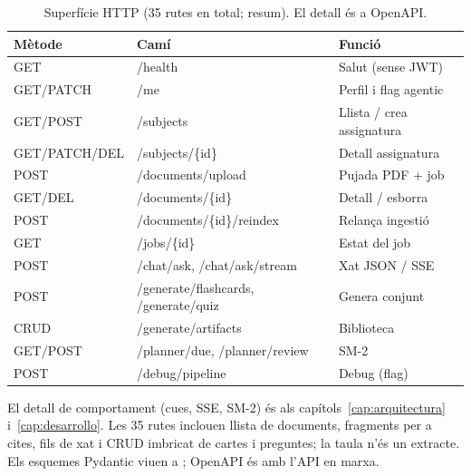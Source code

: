 \begin{table}[htbp]
\centering
\caption{Superfície HTTP (35 rutes en total; resum). El detall és a OpenAPI.}
\label{tab:api}
\small
\begin{tabularx}{\textwidth}{l>{\raggedright\arraybackslash\ttfamily}p{5.2cm}X}
\toprule
Mètode & Camí & Funció \\
\midrule
GET & /health & Salut (sense JWT) \\
GET/PATCH & /me & Perfil i flag agentic \\
GET/POST & /subjects & Llista / crea assignatura \\
GET/PATCH/DEL & /subjects/\{id\} & Detall assignatura \\
POST & /documents/upload & Pujada PDF + job \\
GET/DEL & /documents/\{id\} & Detall / esborra \\
POST & /documents/\{id\}/reindex & Relança ingestió \\
GET & /jobs/\{id\} & Estat del job \\
POST & /chat/ask, /chat/ask/stream & Xat JSON / SSE \\
POST & /generate/flashcards, /generate/quiz & Genera conjunt \\
CRUD & /generate/artifacts & Biblioteca \\
GET/POST & /planner/due, /planner/review & SM-2 \\
POST & /debug/pipeline & Debug (flag) \\
\bottomrule
\end{tabularx}
\end{table}

El detall de comportament (cues, SSE, SM-2) és als capítols~\ref{cap:arquitectura} i~\ref{cap:desarrollo}.
Les 35 rutes inclouen llista de documents, fragments per a cites, fils de xat i CRUD imbricat de cartes i preguntes; la taula n'és un extracte.
Els esquemes Pydantic viuen a ; OpenAPI és  amb l'API en marxa.
